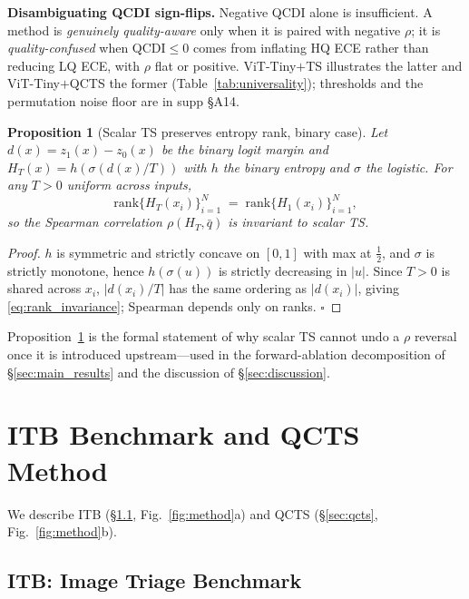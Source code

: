 \documentclass{bmvc2k}
\newtheorem{proposition}{Proposition}
\begin{document}
\textbf{Disambiguating QCDI sign-flips.}
Negative QCDI alone is insufficient. A method is \emph{genuinely quality-aware} only when it is paired with negative $\rho$; it is \emph{quality-confused} when QCDI${\le}0$ comes from inflating HQ ECE rather than reducing LQ ECE, with $\rho$ flat or positive. ViT-Tiny$+$TS illustrates the latter and ViT-Tiny$+$QCTS the former (Table~\ref{tab:universality}); thresholds and the permutation noise floor are in supp \S A14.

\begin{proposition}[Scalar TS preserves entropy rank, binary case]
\label{prop:ts_rank}
Let $d(x){=}z_1(x){-}z_0(x)$ be the binary logit margin and $H_T(x){=}h\!\left(\sigma(d(x)/T)\right)$ with $h$ the binary entropy and $\sigma$ the logistic. For any $T{>}0$ uniform across inputs,
\begin{equation}
\mathrm{rank}\{H_T(x_i)\}_{i=1}^{N} \;=\; \mathrm{rank}\{H_1(x_i)\}_{i=1}^{N},
\label{eq:rank_invariance}
\end{equation}
so the Spearman correlation $\rho(H_T,\bar q)$ is invariant to scalar TS.
\end{proposition}
\begin{proof}
$h$ is symmetric and strictly concave on $[0,1]$ with max at $\tfrac12$, and $\sigma$ is strictly monotone, hence $h(\sigma(u))$ is strictly decreasing in $|u|$. Since $T{>}0$ is shared across $x_i$, $|d(x_i)/T|$ has the same ordering as $|d(x_i)|$, giving \eqref{eq:rank_invariance}; Spearman depends only on ranks. $\square$
\end{proof}
Proposition~\ref{prop:ts_rank} is the formal statement of why scalar TS cannot undo a $\rho$ reversal once it is introduced upstream---used in the forward-ablation decomposition of \S\ref{sec:main_results} and the discussion of \S\ref{sec:discussion}.

\section{ITB Benchmark and QCTS Method}
\label{sec:method}

We describe ITB (\S\ref{sec:itb}, Fig.~\ref{fig:method}a) and QCTS (\S\ref{sec:qcts}, Fig.~\ref{fig:method}b).

\subsection{ITB: Image Triage Benchmark}
\label{sec:itb}
\end{document}
